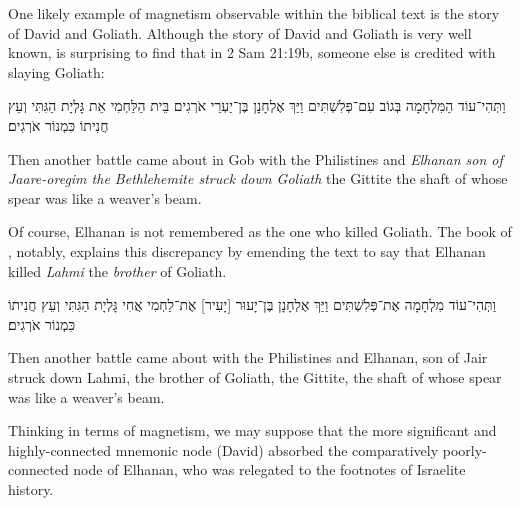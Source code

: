 One likely example of magnetism observable within the biblical text is the story of David and Goliath. Although the story of David and Goliath is very well known, is surprising to find that in 2 Sam 21:19b, someone else is credited with slaying Goliath:
\begin{hebrewtext}
    וַתְּהִי־עוֹד הַמִּלְחָמָה בְּגוֹב עִם־פְּלִשְׁתִּים וַיַּךְ אֶלְחָנָן בֶּן־יַעְרֵי אֹרְגִים בֵּית הַלַּחְמִי אֵת גָּלְיָת הַגִּתִּי וְעֵץ חֲנִיתוֹ כִּמְנוֹר אֹרְגִים׃
\end{hebrewtext}
\begin{translation}
    Then another battle came about in Gob with the Philistines and \emph{Elhanan son of Jaare-oregim the Bethlehemite struck down Goliath} the Gittite the shaft of whose spear was like a weaver's beam.
\end{translation}
\noindent
Of course, Elhanan is not remembered as the one who killed Goliath. The book of \chronicles, notably, explains this discrepancy by emending the text to say that Elhanan killed \emph{Lahmi} the \emph{brother} of Goliath.
\begin{hebrewtext}
    וַתְּהִי־עוֹד מִלְחָמָה אֶת־פְּלִשְׁתִּים וַיַּךְ אֶלְחָנָן בֶּן־יָעוּר [יָעִיר] אֶת־לַחְמִי אֲחִי גָּלְיָת הַגִּתִּי וְעֵץ חֲנִיתוֹ כִּמְנוֹר אֹרְגִים׃ 
\end{hebrewtext}
\begin{translation}
    Then another battle came about with the Philistines and Elhanan, son of Jair struck down Lahmi, the brother of Goliath, the Gittite, the shaft of whose spear was like a weaver's beam.
\end{translation}
\noindent
Thinking in terms of magnetism, we may suppose that the more significant and highly-connected mnemonic node (David) absorbed the comparatively poorly-connected node of Elhanan, who was relegated to the footnotes of Israelite history. 

